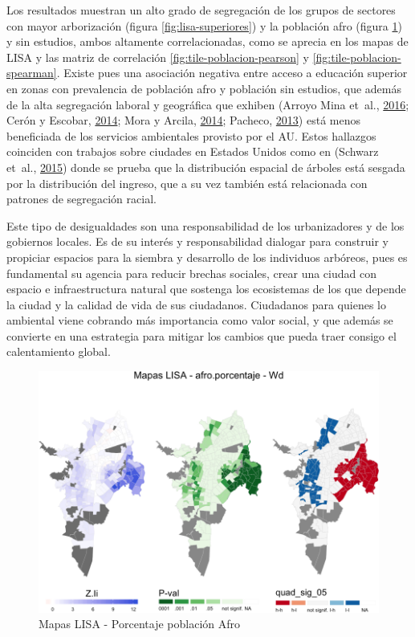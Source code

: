 \documentclass[12pt,a4paper,openany]{book}
\theoremstyle{definition}
\theoremstyle{definition}
\theoremstyle{definition}
\theoremstyle{remark}
\begin{document}
Los resultados muestran un alto grado de segregación de los grupos de
sectores con mayor arborización (figura \ref{fig:lisa-superiores}) y la
población afro (figura \ref{fig:lisa-afro}) y sin estudios, ambos
altamente correlacionadas, como se aprecia en los mapas de LISA y las
matriz de correlación \ref{fig:tile-poblacion-pearson} y
\ref{fig:tile-poblacion-spearman}. Existe pues una asociación negativa
entre acceso a educación superior en zonas con prevalencia de población
afro y población sin estudios, que además de la alta segregación laboral
y geográfica que exhiben (Arroyo Mina et~al.,
\protect\hyperlink{ref-arroyo_mina_afrocolombianos_2016}{2016}; Cerón y
Escobar, \protect\hyperlink{ref-ceron_indice_2014}{2014}; Mora y Arcila,
\protect\hyperlink{ref-mora_brechas_2014}{2014}; Pacheco,
\protect\hyperlink{ref-PACHECO2013121}{2013}) está menos beneficiada de
los servicios ambientales provisto por el AU. Estos hallazgos coinciden
con trabajos sobre ciudades en Estados Unidos como en (Schwarz et~al.,
\protect\hyperlink{ref-schwarz_trees_2015}{2015}) donde se prueba que la
distribución espacial de árboles está sesgada por la distribución del
ingreso, que a su vez también está relacionada con patrones de
segregación racial.

Este tipo de desigualdades son una responsabilidad de los urbanizadores
y de los gobiernos locales. Es de su interés y responsabilidad dialogar
para construir y propiciar espacios para la siembra y desarrollo de los
individuos arbóreos, pues es fundamental su agencia para reducir brechas
sociales, crear una ciudad con espacio e infraestructura natural que
sostenga los ecosistemas de los que depende la ciudad y la calidad de
vida de sus ciudadanos. Ciudadanos para quienes lo ambiental viene
cobrando más importancia como valor social, y que además se convierte en
una estrategia para mitigar los cambios que pueda traer consigo el
calentamiento global.

\begin{figure}

{\centering \includegraphics[width=1\linewidth]{tesis-unigis_files/figure-latex/lisa-afro-1} 

}

\caption{Mapas LISA - Porcentaje población Afro}\label{fig:lisa-afro}
\end{figure}
\end{document}
